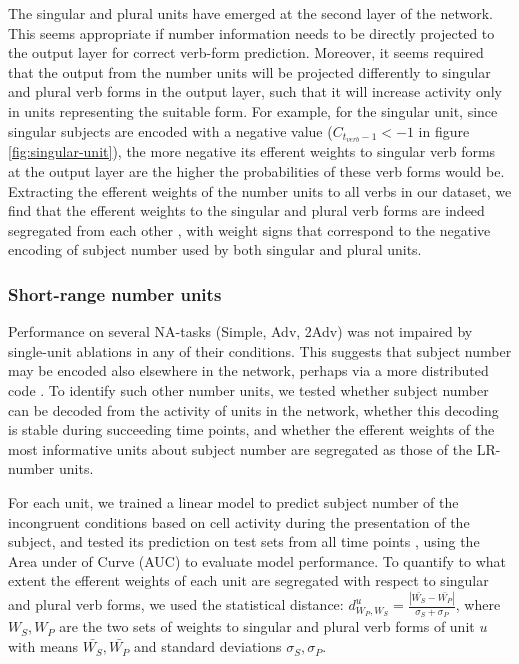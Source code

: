 The singular and plural units have emerged at the second layer of the network. This seems appropriate if number information needs to be directly projected to the output layer for correct verb-form prediction. Moreover, it seems required that the output from the number units will be projected differently to singular and plural verb forms in the output layer, such that it will increase activity only in units representing the suitable form. For example, for the singular unit, since singular subjects are encoded with a negative value ($C_{t_{verb}-1}<-1$ in figure \ref{fig:singular-unit}), the more negative its efferent weights to singular verb forms at the output layer are the higher the probabilities of these verb forms would be. Extracting the efferent weights of the number units to all verbs in our dataset, we find that the efferent weights to the singular and plural verb forms are indeed segregated from each other , with weight signs that correspond to the negative encoding of subject number used by both singular and plural units. 

\subsubsection{Short-range number units}
Performance on several NA-tasks (Simple, Adv, 2Adv) was not impaired by single-unit ablations in any of their conditions. This suggests that subject number may be encoded also elsewhere in the network, perhaps via a more distributed code . To identify such other number units, we tested whether subject number can be decoded from the activity of units in the network, whether this decoding is stable during succeeding time points, and whether the efferent weights of the most informative units about subject number are segregated as those of the LR-number units. 

For each unit, we trained a linear model to predict subject number of the incongruent conditions based on cell activity during the presentation of the subject, and tested its prediction on test sets from all time points , using the Area under of Curve (AUC) to evaluate model performance. To quantify to what extent the efferent weights of each unit are segregated with respect to singular and plural verb forms, we used the statistical distance: $d^u_{W_P, W_S}=\frac{|\bar{W_S}-\bar{W_P}|}{\sigma_S+\sigma_P}$, where $W_S, W_P$ are the two sets of weights to singular and plural verb forms of unit $u$ with means $\bar{W_S}, \bar{W_P}$ and standard deviations $\sigma_S, \sigma_P$. 


